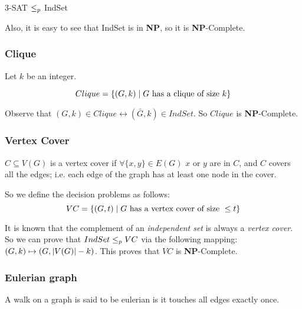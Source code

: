         \begin{theorem}\label{thm:indset_npc}
            3-SAT $\leq_p$ IndSet
        \end{theorem}
        
        Also, it is easy to see that IndSet is in \textbf{NP}, so it is \textbf{NP}-Complete.


    \subsubsection{Clique}\label{subsubsec:problem_clique}
        Let $k$ be an integer.
        
        \begin{definition}[Clique]\label{def:clique}
            \[ Clique = \{ (G,k) \; \vert \; G \text{ has a clique of size } k \} \]
        \end{definition}

        Observe that $(G,k) \in Clique \leftrightarrow (\bar{G},k) \in IndSet$. So $Clique$ is \textbf{NP}-Complete.


    \subsubsection{Vertex Cover}\label{subsubsec:problem_vertexcover}
        \begin{definition}\label{def:vertcover}
            $C \subseteq V(G)$ is a vertex cover if $\forall \{ x,y \} \in E(G)$ $x$ or $y$ are in $C$, and $C$ covers all the edges; i.e. each edge of the graph has at least one node in the cover.
        \end{definition}

        So we define the decision problems as follows:
        \[ VC = \{ (G,t) \; \vert \; G \text{ has a vertex cover of size }  \leq t \} \]

        It is known that the complement of an \textit{independent set} is always a \textit{vertex cover}.
        So we can prove that $IndSet \leq_p VC$ via the following mapping: $(G,k) \mapsto (G, \vert V(G) \vert - k)$.
        This proves that $VC$ is \textbf{NP}-Complete.

    
    \subsubsection{Eulerian graph}\label{subsubsec:problem_euleriangraph}
        \begin{definition}\label{def:eulerian_walk}
            A walk on a graph is said to be eulerian is it touches all edges exactly once.
        \end{definition}
        
